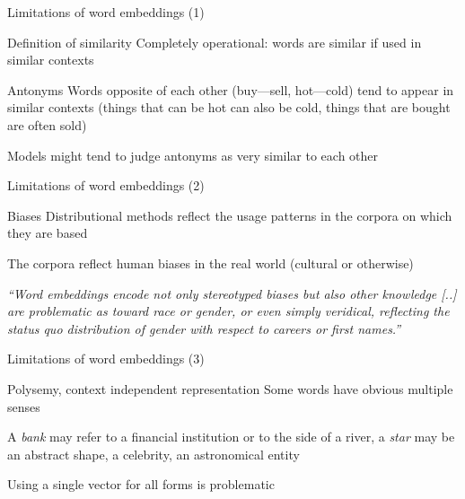 \documentclass[12pt,aspectratio=169,handout]{beamer}
\begin{document}
\begin{frame}{Limitations of word embeddings (1)}

\begin{block}{Definition of similarity}
Completely operational: words are similar if used in similar contexts
\end{block}

\begin{block}{Antonyms}
Words opposite of each other (buy---sell, hot---cold) tend to appear in similar contexts (things that can be hot can also be cold, things that are bought are often sold)

Models might tend to judge antonyms as very similar to each other
\end{block}

\end{frame}

\begin{frame}{Limitations of word embeddings (2)}

\begin{block}{Biases}
Distributional methods reflect the usage patterns in the corpora on which they are based

The corpora reflect human biases in the real world (cultural or otherwise)
	
\emph{``Word embeddings encode not only stereotyped biases but also other knowledge
[..] are problematic as toward race or gender, or even simply veridical, reflecting the status quo distribution of gender with respect to careers or first names.''}
\end{block}



\end{frame}

\begin{frame}{Limitations of word embeddings (3)}
	
\begin{block}{Polysemy, context independent representation}
Some words have obvious multiple senses

A \emph{bank} may refer to a financial institution or to the side of a river, a \emph{star} may be an abstract shape, a celebrity, an astronomical entity

Using a single vector for all forms	is problematic
\end{block}


\end{frame}
\end{document}

